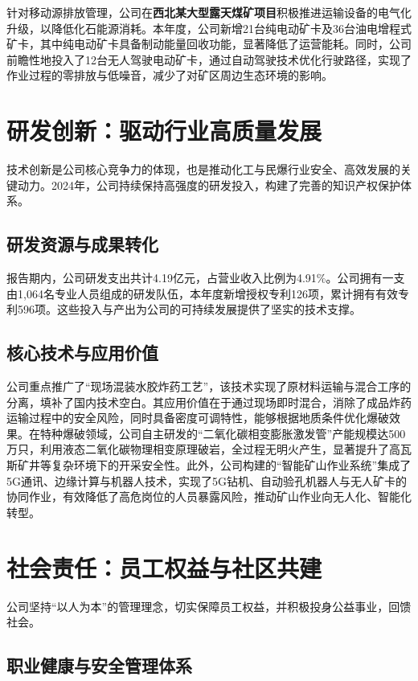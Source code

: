 \documentclass[a4paper,12pt]{article}
\begin{document}
针对移动源排放管理，公司在\textbf{西北某大型露天煤矿项目}积极推进运输设备的电气化升级，以降低化石能源消耗。本年度，公司新增21台纯电动矿卡及36台油电增程式矿卡，其中纯电动矿卡具备制动能量回收功能，显著降低了运营能耗。同时，公司前瞻性地投入了12台无人驾驶电动矿卡，通过自动驾驶技术优化行驶路径，实现了作业过程的零排放与低噪音，减少了对矿区周边生态环境的影响。

\section{研发创新：驱动行业高质量发展}

技术创新是公司核心竞争力的体现，也是推动化工与民爆行业安全、高效发展的关键动力。2024年，公司持续保持高强度的研发投入，构建了完善的知识产权保护体系。

\subsection{研发资源与成果转化}

报告期内，公司研发支出共计4.19亿元，占营业收入比例为4.91\%。公司拥有一支由1,064名专业人员组成的研发队伍，本年度新增授权专利126项，累计拥有有效专利596项。这些投入与产出为公司的可持续发展提供了坚实的技术支撑。

\subsection{核心技术与应用价值}

公司重点推广了“现场混装水胶炸药工艺”，该技术实现了原材料运输与混合工序的分离，填补了国内技术空白。其应用价值在于通过现场即时混合，消除了成品炸药运输过程中的安全风险，同时具备密度可调特性，能够根据地质条件优化爆破效果。在特种爆破领域，公司自主研发的“二氧化碳相变膨胀激发管”产能规模达500万只，利用液态二氧化碳物理相变原理破岩，全过程无明火产生，显著提升了高瓦斯矿井等复杂环境下的开采安全性。此外，公司构建的“智能矿山作业系统”集成了5G通讯、边缘计算与机器人技术，实现了5G钻机、自动验孔机器人与无人矿卡的协同作业，有效降低了高危岗位的人员暴露风险，推动矿山作业向无人化、智能化转型。

\section{社会责任：员工权益与社区共建}

公司坚持“以人为本”的管理理念，切实保障员工权益，并积极投身公益事业，回馈社会。

\subsection{职业健康与安全管理体系}
\end{document}
